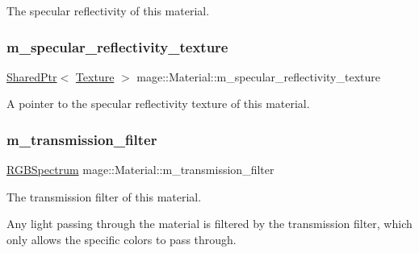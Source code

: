 The specular reflectivity of this material. \hypertarget{structmage_1_1_material_ac925df9d71f8668c03e8efada632b300}{}\label{structmage_1_1_material_ac925df9d71f8668c03e8efada632b300} 
\subsubsection{\texorpdfstring{m\+\_\+specular\+\_\+reflectivity\+\_\+texture}{m\_specular\_reflectivity\_texture}}
{\footnotesize\ttfamily \hyperlink{namespacemage_a1e01ae66713838a7a67d30e44c67703e}{Shared\+Ptr}$<$ \hyperlink{classmage_1_1_texture}{Texture} $>$ mage\+::\+Material\+::m\+\_\+specular\+\_\+reflectivity\+\_\+texture}

A pointer to the specular reflectivity texture of this material. \hypertarget{structmage_1_1_material_a9573a0d2a5fb0322f9eb103ace34dd47}{}\label{structmage_1_1_material_a9573a0d2a5fb0322f9eb103ace34dd47} 
\subsubsection{\texorpdfstring{m\+\_\+transmission\+\_\+filter}{m\_transmission\_filter}}
{\footnotesize\ttfamily \hyperlink{structmage_1_1_r_g_b_spectrum}{R\+G\+B\+Spectrum} mage\+::\+Material\+::m\+\_\+transmission\+\_\+filter}

The transmission filter of this material.

Any light passing through the material is filtered by the transmission filter, which only allows the specific colors to pass through. 